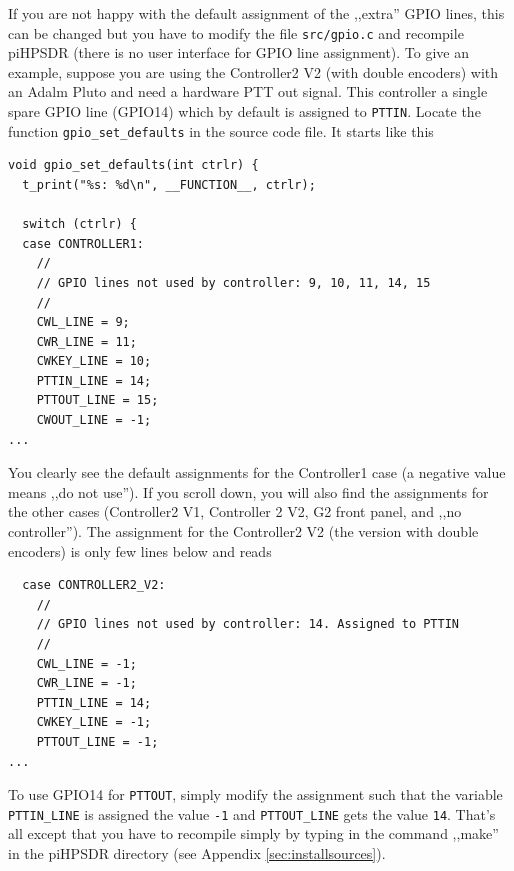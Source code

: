 \documentclass[12pt]{book}
\def\rett#1{\texttt{\color{red}#1}}
\begin{document}
If you are not happy with the default assignment of the ,,extra'' GPIO lines, this can be changed
but you have to modify the file \texttt{src/gpio.c} and recompile piHPSDR (there is no user interface
for GPIO line assignment). To give an example, suppose you are using the Controller2 V2 (with double
encoders) with an Adalm Pluto and need a hardware PTT out signal. This controller a single spare GPIO line
(GPIO14) which by default is assigned to \rett{PTTIN}. Locate the function \texttt{gpio\_set\_defaults}
in the source code file. It starts like this

\begin{small}
\begin{verbatim}
void gpio_set_defaults(int ctrlr) {
  t_print("%s: %d\n", __FUNCTION__, ctrlr);

  switch (ctrlr) {
  case CONTROLLER1:
    //
    // GPIO lines not used by controller: 9, 10, 11, 14, 15
    //
    CWL_LINE = 9;
    CWR_LINE = 11;
    CWKEY_LINE = 10; 
    PTTIN_LINE = 14;
    PTTOUT_LINE = 15;
    CWOUT_LINE = -1;
...    
\end{verbatim}
\end{small}

You clearly see the default assignments for the Controller1 case (a negative value means ,,do not use'').
If you scroll down, you will also find the assignments for the other cases (Controller2 V1, Controller 2 V2,
G2 front panel, and ,,no controller''). The assignment for the Controller2 V2 (the version with double
encoders) is only few lines below and reads

\begin{small}
\begin{verbatim}
  case CONTROLLER2_V2:
    //
    // GPIO lines not used by controller: 14. Assigned to PTTIN 
    //
    CWL_LINE = -1;
    CWR_LINE = -1;
    PTTIN_LINE = 14;
    CWKEY_LINE = -1;
    PTTOUT_LINE = -1;
...
\end{verbatim}
\end{small}

To use GPIO14 for \texttt{PTTOUT}, simply modify the assignment such that the variable
 \texttt{PTTIN\_LINE} is assigned the
value \texttt{-1} and \texttt{PTTOUT\_LINE} gets the value \texttt{14}.
 That's all except that you have to recompile
simply by typing in the command ,,make'' in the piHPSDR directory (see Appendix \ref{sec:installsources}).
\end{document}
